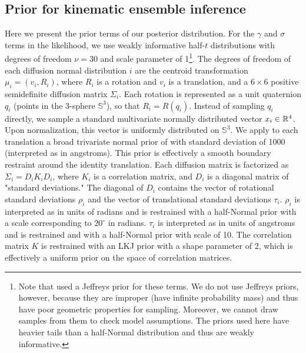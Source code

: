 \documentclass[../../main.tex]{subfiles}
\begin{document}
\begin{refsection}
	\section{Prior for kinematic ensemble inference}

	Here we present the prior terms of our posterior distribution.
	For the $\gamma$ and $\sigma$ terms in the likelihood, we use weakly informative half-$t$ distributions with degrees of freedom $\nu=30$ and scale parameter of 1\footnote{
		Note that \cite{riepingInferentialStructureDetermination2005} used a Jeffreys prior for these terms.
		We do not use Jeffreys priors, however, because they are improper (\ie have infinite probability mass) and thus have poor geometric properties for sampling.
		Moreover, we cannot draw samples from them to check model assumptions.
		The priors used here have heavier tails than a half-Normal distribution and thus are weakly informative.}.
	The degrees of freedom of each diffusion normal distribution $i$ are the centroid transformation $\mu_i = (v_i, R_i)$, where $R_i$ is a rotation and $v_i$ is a translation, and a $6 \times 6$ positive semidefinite diffusion matrix $\Sigma_i$.
	Each rotation is represented as a unit quaternion $q_i$ (\ie points in the 3-sphere $\mathbb{S}^3$), so that $R_i = R(q_i)$.
	Instead of sampling $q_i$ directly, we sample a standard multivariate normally distributed vector $x_i \in \mathbb{R}^4$.
	Upon normalization, this vector is uniformly distributed on $\mathbb{S}^3$.
	We apply to each translation a broad trivariate normal prior of with standard deviation of 1000 (interpreted as in angstroms).
	This prior is effectively a smooth boundary restraint around the identity translation.
	Each diffusion matrix is factorized as $\Sigma_i = D_i K_i D_i$, where $K_i$ is a correlation matrix, and $D_i$ is a diagonal matrix of "standard deviations."
	The diagonal of $D_i$ contains the vector of rotational standard deviations $\rho_i$ and the vector of translational standard deviations $\tau_i$.
	$\rho_i$ is interpreted as in units of radians and is restrained with a half-Normal prior with a scale corresponding to $20^\circ$ in radians.
	$\tau_i$ is interpreted as in units of angstroms and is restrained and with a half-Normal prior with scale of 10.
	The correlation matrix $K$ is restrained with an LKJ prior with a shape parameter of 2, which is effectively a uniform prior on the space of correlation matrices\supercite{lewandowskiGeneratingRandomCorrelation2009}.


\end{refsection}
\end{document}
